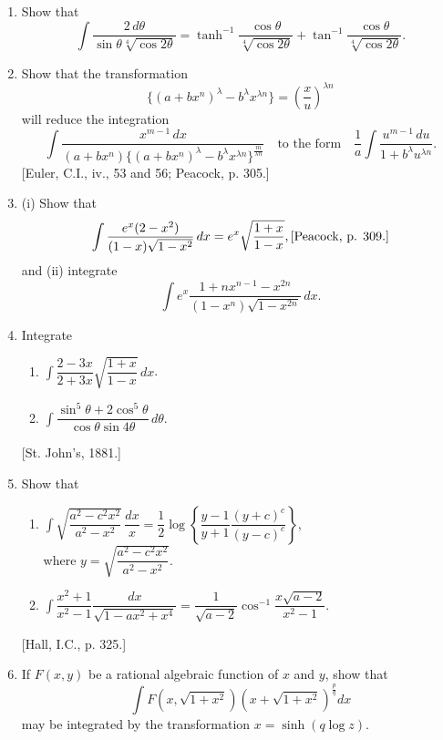 \documentclass[11pt, a4paper]{article}
\newcommand{\source}[1]{\hfill\textnormal{[#1]}}
\begin{document}
\begin{enumerate}[leftmargin=2em]
\item Show that
\[
\int \dfrac{2\,d\theta}{\sin\theta\sqrt[4]{\cos2\theta}}=\tanh^{-1}\dfrac{\cos\theta}{\sqrt[4]{\cos2\theta}}+\tan^{-1}\dfrac{\cos\theta}{\sqrt[4]{\cos2\theta}}.
\]

\item Show that the transformation
\[
\{(a+bx^n)^\lambda-b^\lambda x^{\lambda n}\}=\left(\dfrac{x}{u}\right)^{\lambda n}
\]
will reduce the integration
\[
\int \dfrac{x^{m-1}\,dx}{(a+bx^n)\{(a+bx^n)^\lambda-b^\lambda x^{\lambda n}\}^{\frac{m}{\lambda n}}} \quad\text{to the form}\quad \dfrac{1}{a}\int \dfrac{u^{m-1}\,du}{1+b^\lambda u^{\lambda n}}.
\]
\source{Euler, C.I., iv., 53 and 56; Peacock, p. 305.}

\item[34.] (i) Show that
\[
\int \dfrac{e^x(2-x^2)}{(1-x)\sqrt{1-x^2}}\,dx=e^x\sqrt{\dfrac{1+x}{1-x}}, \source{Peacock, p. 309.}
\]
and (ii) integrate
\[
\int e^x\dfrac{1+nx^{n-1}-x^{2n}}{(1-x^n)\sqrt{1-x^{2n}}}\,dx.
\]

\item Integrate
\begin{enumerate}[label=(\roman*)]
\item $\displaystyle\int \dfrac{2-3x}{2+3x}\sqrt{\dfrac{1+x}{1-x}}\,dx$.
\item $\displaystyle\int \dfrac{\sin^5\theta+2\cos^5\theta}{\cos\theta\sin4\theta}\,d\theta$.
\end{enumerate}
\source{St. John's, 1881.}

\item Show that
\begin{enumerate}[label=(\roman*)]
\item $\displaystyle\int \sqrt{\dfrac{a^2-c^2x^2}{a^2-x^2}}\,\dfrac{dx}{x}=\dfrac12\log\left\{\dfrac{y-1}{y+1}\dfrac{(y+c)^c}{(y-c)^c}\right\}$,\\[0.3em]
where $y=\sqrt{\dfrac{a^2-c^2x^2}{a^2-x^2}}$.
\item $\displaystyle\int \dfrac{x^2+1}{x^2-1}\dfrac{dx}{\sqrt{1-ax^2+x^4}}=\dfrac{1}{\sqrt{a-2}}\cos^{-1}\dfrac{x\sqrt{a-2}}{x^2-1}$.
\end{enumerate}
\source{Hall, I.C., p. 325.}

\item If $F(x,y)$ be a rational algebraic function of $x$ and $y$, show that
\[
\int F\!\left(x,\sqrt{1+x^2}\right)\left(x+\sqrt{1+x^2}\right)^{\frac{p}{q}}dx
\]
may be integrated by the transformation $x=\sinh(q\log z)$.


\end{enumerate}
\end{document}
